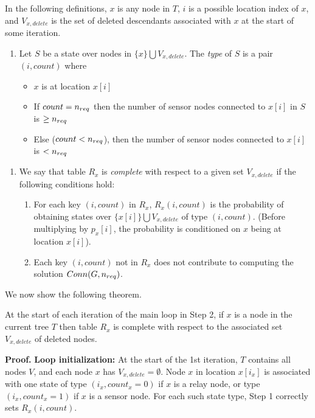 In the following definitions, $x$ is any node in $T$,
$i$ is a possible location index of $x$, and  $V_{x,delete}$ is
the set of deleted descendants associated with $x$ at the start of some
iteration.

\begin{enumerate}
\item[{\bf [D1]}]
    Let $S$ be a state over nodes in $\{ x \} \bigcup V_{x,delete}$.
    The {\em type} of $S$ is a pair $(i,count)$ where
    \begin{itemize}
    \item   $x$ is at location $x[i]$
    \item   If $count = {n_{req}}$ then the number of sensor nodes connected to
    	    $x[i]$ in $S$ is $\geq {n_{req}}$
    \item   Else ($count < {n_{req}}$), then the number of sensor nodes
    	    connected to $x[i]$ is $< {n_{req}}$
    \end{itemize} 	   
\end{enumerate}

\begin{enumerate}
\item[{\bf [D2]}]
    We say that table $R_x$ is {\em complete} with respect to a given
    set $V_{x,delete}$ if the following conditions hold:
    \begin{enumerate}
    \item  For each key $(i,count)$ in $R_x$, $R_x(i,count)$ is
    	   the probability of obtaining states over
	   $\{ x[i] \} \bigcup V_{x,delete}$ of type $(i,count)$.
	   (Before multiplying by $p_x[i]$, the probability is conditioned
	   on $x$ being at location $x[i]$).
    \item  Each key $(i,count)$ not in $R_x$ does not contribute to
    	   computing the solution $Conn(G,{n_{req}})$.
    \end{enumerate}
\end{enumerate}

\nwline
We now show the following theorem.

\begin{thm} \label{thm:correctness}
    At the start of each iteration of the main loop in Step 2,
    if $x$ is a node in the current tree $T$ then table $R_x$ is complete
    with respect to the associated set $V_{x,delete}$ of deleted nodes.
\end{thm}

\nwline
{\bf Proof.}
\nwline
{\bf Loop initialization:}
At the start of the 1st iteration, $T$ contains all nodes $V$, and
each node $x$ has $V_{x,delete}= \emptyset$.
%
Node $x$ in location $x[i_x]$ is associated with one state of type
$(i_x,count_x= 0)$ if $x$ is a relay node, or type
$(i_x,count_x= 1)$ if $x$ is a sensor node.
%
For each such state type, Step 1 correctly sets $R_x(i,count)$.

